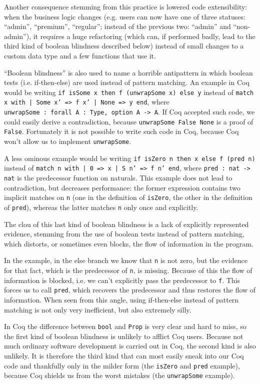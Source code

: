 \documentclass[declaration,mgr,english,shortabstract]{iithesis}
\newcommand{\m}[1]{\texttt{#1}}
\begin{document}
Another consequence stemming from this practice is lowered code extensibility: when the business logic changes (e.g. users can now have one of three statuses: ``admin'', ``premium'', ``regular''; instead of the previous two: ``admin'' and ``non-admin''), it requires a huge refactoring (which can, if performed badly, lead to the third kind of boolean blindness described below) instead of small changes to a custom data type and a few functions that use it.

``Boolean blindness'' is also used to name a horrible antipattern in which boolean tests (i.e. if-then-else) are used instead of pattern matching. An example in Coq would be writing \m{if isSome x then f (unwrapSome x) else y} instead of \m{match x with | Some x' => f x' | None => y end}, where \m{unwrapSome\ :\ forall\ A\ :\ Type, option A -> A}. If Coq accepted such code, we could easily derive a contradiction, because \m{unwrapSome False None} is a proof of \m{False}. Fortunately it is not possible to write such code in Coq, because Coq won't allow us to implement \m{unwrapSome}.

A less ominous example would be writing \m{if isZero n then x else f (pred n)} instead of \m{match n with | 0 => x | S n' => f n' end}, where \m{pred\ :\ nat -> nat} is the predecessor function on naturals. This example does not lead to contradiction, but decreases performance: the former expression contains two implicit matches on \m{n} (one in the definition of \m{isZero}, the other in the definition of \m{pred}), whereas the latter matches \m{n} only once and explicitly.

The clou of this last kind of boolean blindness is a lack of explicitly represented evidence, stemming from the use of boolean tests instead of pattern matching, which distorts, or sometimes even blocks, the flow of information in the program.

In the example, in the else branch we know that \m{n} is not zero, but the evidence for that fact, which is the predecessor of \m{n}, is missing. Because of this the flow of information is blocked, i.e. we can't explicitly pass the predecessor to \m{f}. This forces us to call \m{pred}, which recovers the predecessor and thus restores the flow of information. When seen from this angle, using if-then-else instead of pattern matching is not only very inefficient, but also extremely silly.

In Coq the difference between \m{bool} and \m{Prop} is very clear and hard to miss, so the first kind of boolean blindness is unlikely to afflict Coq users. Because not much ordinary software development is carried out in Coq, the second kind is also unlikely. It is therefore the third kind that can most easily sneak into our Coq code and thankfully only in the milder form (the \m{isZero} and \m{pred} example), because Coq shields us from the worst mistakes (the \m{unwrapSome} example).
\end{document}
